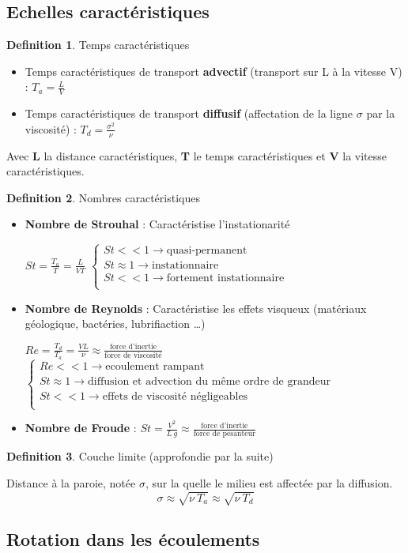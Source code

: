 \documentclass[french]{article}
\theoremstyle{definition}
\newtheorem{definition}{Definition}[section]
\begin{document}
\subsection{Echelles caractéristiques}

\begin{definition} Temps caractéristiques\par
	\begin{itemize} 
		\item Temps caractéristiques de transport \textbf{advectif} (transport sur L à la vitesse V) : $T_a = \frac{L}{V}$
		\item Temps caractéristiques de transport \textbf{diffusif} (affectation de la ligne $\sigma$ par la viscosité) : $T_d = \frac{\sigma^2}{\nu}$
	\end{itemize}
	Avec \textbf{L} la distance caractéristiques, \textbf{T} le temps caractéristiques et \textbf{V} la vitesse caractéristiques.
\end{definition}

\begin{definition} Nombres caractéristiques\par
	\begin{itemize} 
		\item \textbf{Nombre de Strouhal} : Caractéristise l'instationarité
		
		$St = \frac{T_a}{T} = \frac{L}{VT}$
		$
		\left\{
			\begin{array}{ll}
				St << 1 \rightarrow \mbox{quasi-permanent} \\
				St \approx 1 \rightarrow \mbox{instationnaire} \\
				St << 1 \rightarrow \mbox{fortement instationnaire} \\
			\end{array}
		\right.
		$

		\item \textbf{Nombre de Reynolds} : Caractéristise les effets visqueux (matériaux géologique, bactéries, lubrifiaction \dots)
		
		$Re = \frac{T_d}{T_a} = \frac{VL}{\nu}  \approx \frac{\mbox{force d'inertie}}{\mbox{force de viscosité}}$
		$
		\left\{
			\begin{array}{ll}
				Re << 1 \rightarrow \mbox{ecoulement rampant} \\
				St \approx 1 \rightarrow \mbox{diffusion et advection du même ordre de grandeur} \\
				St << 1 \rightarrow \mbox{effets de viscosité négligeables} \\
			\end{array}
		\right.
		$
		\item \textbf{Nombre de Froude} : $St = \frac{V^2}{L \ g}  \approx \frac{\mbox{force d'inertie}}{\mbox{force de pesanteur}}$ 
	\end{itemize} 
\end{definition}

\begin{definition} Couche limite (approfondie par la suite) \par
	Distance à la paroie, notée $\sigma$, sur la quelle le milieu est affectée par la diffusion. 
	$$ \sigma \approx \sqrt{\nu \ T_a } \approx \sqrt{\nu \ T_d }$$ 
\end{definition}

\subsection{Rotation dans les écoulements}
\end{document}
